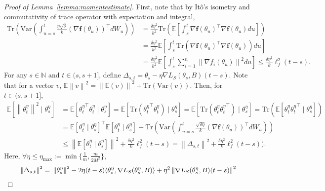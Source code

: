 \documentclass{article}
\newcommand{\norm}[1]{\left\lVert#1\right\rVert} %
\begin{document}
\begin{proof}[Proof of Lemma~\ref{lemma:momentestimate}]
	First, note that by It\^o's isometry and commutativity of trace operator with expectation and integral,
	\begin{align*}
		\mathrm{Tr}\left(\mathrm{Var}\left(\int_{u=s}^t \frac{\eta \sqrt{\delta }}{k} ( \nabla \textbf{f}(\theta_u))^\top dW_u\right)\right) 
		&= \frac{\delta \eta^2}{k^2} \mathrm{Tr} \left( \mathbb{E}  \left[\int_{s}^t \nabla \mathbf{f}(\theta_u)^\top  \nabla \mathbf{f}(\theta_u)  du \right] \right)\\
		&=\frac{\delta \eta^2}{k^2} \mathbb{E}  \left[\int_{s}^t  \mathrm{Tr} \left( \nabla \mathbf{f}(\theta_u)^\top  \nabla \mathbf{f}(\theta_u) \right) du \right] \\
		&= \frac{\delta \eta^2}{k^2} \mathbb{E}  \left[\int_{s}^t  \sum_{i=1}^n \norm{\nabla f_i (\theta_u)}^2 du \right]\leq  \frac{\delta \eta^2}{k} \ell_f^2 (t-s).
	\end{align*}
	For any $s \in \mathbb{N}$ and $t \in (s, s+1]$, define $\Delta_{s,t} = \theta_s - \eta \nabla L_S (\theta_s, B)(t-s)$. Note that for a vector $v$, $\mathbb{E}\norm{v}^2 = \norm{\mathbb{E}(v)}^2 + \mathrm{Tr}(\mathrm{Var}(v))$. Then, for $t \in (s, s+1]$,
	\begin{align*}
		\mathbb{E} [ \norm{\theta_t^\eta}^2 \mid \theta_s^\eta] &= \mathbb{E} [ {\theta_t^\eta}^\top \theta_t^\eta \mid \theta_s^\eta] = \mathbb{E} [\mathrm{Tr}({\theta_t^\eta}^\top \theta_t^\eta)  \mid \theta_s^\eta] = \mathbb{E} [\mathrm{Tr}(\theta_t^\eta {\theta_t^\eta}^\top)  \mid \theta_s^\eta] = \mathrm{Tr}(\mathbb{E}[\theta_t^\eta {\theta_t^\eta}^\top \mid \theta_s^\eta]) \\
		&= \mathbb{E}[\theta_t^\eta  \mid \theta_s^\eta]^\top \mathbb{E}[\theta_t^\eta  \mid \theta_s^\eta] +\mathrm{Tr}\left(\mathrm{Var}\left(\int_{u=s}^t \frac{\sqrt{\delta \eta}}{k} ( \nabla \textbf{f}(\theta_u))^\top dW_u\right)\right) \\
		&\leq \norm{\mathbb{E}[\theta_t^\eta  \mid \theta_s^\eta]}^2 + \frac{\delta \eta^2}{k} \ell_f^2 (t-s)
		= \norm{\Delta_{s,t}}^2 + \frac{\delta \eta^2}{k} \ell_f^2 (t-s)).
	\end{align*}
	Here, $\forall \eta \leq \eta_{\max} := \min \{\frac{1}{m}, \frac{m}{2M^2}\}$, 
	\begin{align}
		\norm{\Delta_{s,t}}^2 =&\; \norm{\theta_s^\eta}^2 - 2\eta(t-s) \langle \theta_s^\eta, \nabla L_S(\theta_s^\eta, B) \rangle + \eta^2 \norm{\nabla L_S (\theta_s^\eta, B) (t-s)}^2 \notag\\

\end{align}
\end{proof}
\end{document}
